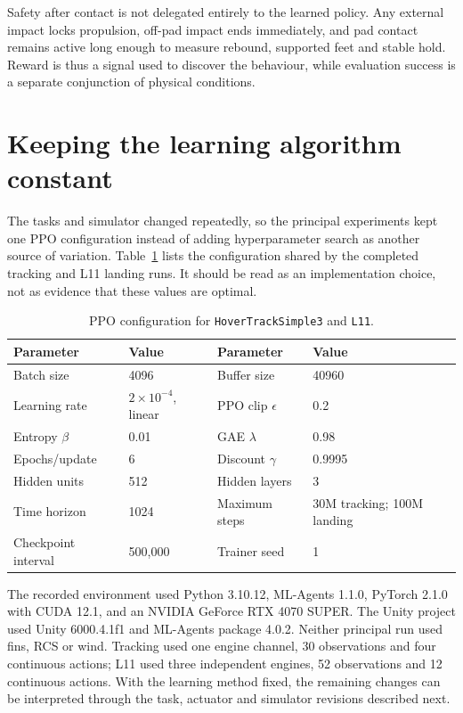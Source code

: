 Safety after contact is not delegated entirely to the learned policy. Any external impact locks
propulsion, off-pad impact ends immediately, and pad contact remains active long enough to
measure rebound, supported feet and stable hold. Reward is thus a signal used to discover the
behaviour, while evaluation success is a separate conjunction of physical conditions.

\section{Keeping the learning algorithm constant}

The tasks and simulator changed repeatedly, so the principal experiments kept one PPO
configuration instead of adding hyperparameter search as another source of variation.
Table~\ref{tab:ppo} lists the configuration shared by the completed tracking and L11 landing
runs. It should be read as an implementation choice, not as evidence that these values are
optimal.

\begin{table}[htbp]
  \centering
  \caption{PPO configuration for \texttt{HoverTrackSimple3} and \texttt{L11}.}
  \label{tab:ppo}
  \begin{tabular}{ll@{\qquad}ll}
    \toprule
    Parameter & Value & Parameter & Value \\
    \midrule
    Batch size & 4096 & Buffer size & 40960 \\
    Learning rate & $2\times10^{-4}$, linear & PPO clip $\epsilon$ & 0.2 \\
    Entropy $\beta$ & 0.01 & GAE $\lambda$ & 0.98 \\
    Epochs/update & 6 & Discount $\gamma$ & 0.9995 \\
    Hidden units & 512 & Hidden layers & 3 \\
    Time horizon & 1024 & Maximum steps & 30M tracking; 100M landing \\
    Checkpoint interval & 500,000 & Trainer seed & 1 \\
    \bottomrule
  \end{tabular}
\end{table}

The recorded environment used Python 3.10.12, ML-Agents 1.1.0, PyTorch 2.1.0 with CUDA 12.1,
and an NVIDIA GeForce RTX 4070 SUPER. The Unity project used Unity 6000.4.1f1 and ML-Agents
package 4.0.2. Neither principal run used fins, RCS or wind. Tracking used one engine channel,
30 observations and four continuous actions; L11 used three independent engines, 52
observations and 12 continuous actions. With the learning method fixed, the remaining changes
can be interpreted through the task, actuator and simulator revisions described next.
